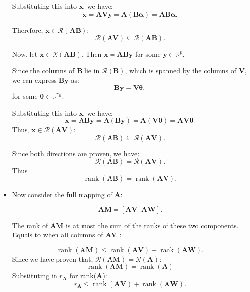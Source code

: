 \documentclass[12pt]{article}
\newcommand{\bmat}[1]{\mathbf{#1}} %
\begin{document}
\begin{itemize}
Substituting this into \( \mathbf{x} \), we have:
  \[
  \mathbf{x} = \mathbf{A}\mathbf{V}\mathbf{y} = \mathbf{A}(\mathbf{B}\boldsymbol{\alpha}) = \mathbf{AB}\boldsymbol{\alpha}.
  \]

Therefore, \( \mathbf{x} \in \mathcal{R}(\mathbf{AB}) \):
  \[
  \mathcal{R}(\mathbf{AV}) \subseteq \mathcal{R}(\mathbf{AB}).
  \]

\vspace{\baselineskip}

Now, let \( \mathbf{x} \in \mathcal{R}(\mathbf{AB}) \). Then \( \mathbf{x} = \mathbf{AB}\mathbf{y} \) for some \( \mathbf{y} \in \mathbb{R}^p \).



Since the columns of \( \mathbf{B} \) lie in \( \mathcal{R}(\mathbf{B}) \), which is spanned by the columns of \( \mathbf{V} \), we can express \( \mathbf{B}\mathbf{y} \) as:
  \[
  \mathbf{B}\mathbf{y} = \mathbf{V}\boldsymbol{\theta},
  \]
  for some \( \boldsymbol{\theta} \in \mathbb{R}^{r_B} \).

Substituting this into \( \mathbf{x} \), we have:
  \[
  \mathbf{x} = \mathbf{AB}\mathbf{y} = \mathbf{A}(\mathbf{B}\mathbf{y}) = \mathbf{A}(\mathbf{V}\boldsymbol{\theta}) = \mathbf{AV}\boldsymbol{\theta}.
  \]
Thus, \( \mathbf{x} \in \mathcal{R}(\mathbf{AV}) \):
  \[
  \mathcal{R}(\mathbf{AB}) \subseteq \mathcal{R}(\mathbf{AV}).
  \]


Since both directions are proven, we have:
\[
\mathcal{R}(\mathbf{AB}) = \mathcal{R}(\mathbf{AV}).
\]
Thus:
\[
\operatorname{rank}(\mathbf{AB}) = \operatorname{rank}(\mathbf{AV}).
\]


\item Now consider the full mapping of \( \mathbf{A} \):

\[
\mathbf{A}\mathbf{M} = [\mathbf{A}\mathbf{V} \, | \, \mathbf{A}\mathbf{W}].
\]

The rank of \( \mathbf{AM} \) is at most the sum of the ranks of these two components.
Equals to  when all columns of $\bmat{AV}$
:

\[
\operatorname{rank}{(\mathbf{AM})} \leq \operatorname{rank}(\mathbf{A}\mathbf{V}) + \operatorname{rank}(\mathbf{A}\mathbf{W}).
\]
Since we have proven that, $\mathcal{R}(\bmat{AM}) = \mathcal{R}(\bmat{A}) $:
\[
\operatorname{rank}{(\mathbf{AM})} = \operatorname{rank}{(\mathbf{A})}
\]
Substituting in $r_{\mathbf{A}}$ for rank($\bmat{A}$):
\[
r_{\mathbf{A}}  \leq \operatorname{rank}(\mathbf{A}\mathbf{V}) + \operatorname{rank}(\mathbf{A}\mathbf{W}).
\]


\end{itemize}
\end{document}
